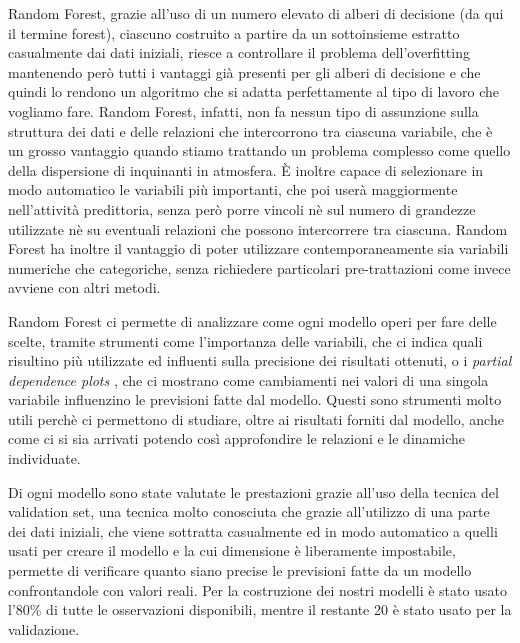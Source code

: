 \documentclass[a4paper]{report}
\begin{document}
Random Forest, grazie all'uso di un numero elevato di alberi di decisione (da qui il termine forest), ciascuno costruito a partire da un sottoinsieme estratto casualmente dai dati iniziali, riesce a controllare il problema dell'overfitting mantenendo però tutti i vantaggi già presenti per gli alberi di decisione e che quindi lo rendono un algoritmo che si adatta perfettamente al tipo di lavoro che vogliamo fare. Random Forest, infatti, non fa nessun tipo di assunzione sulla struttura dei dati e delle relazioni che intercorrono tra ciascuna variabile, che è un grosso vantaggio quando stiamo trattando un problema complesso come quello della dispersione di inquinanti in atmosfera. È inoltre capace di selezionare in modo automatico le variabili più importanti, che poi userà maggiormente nell'attività predittoria, senza però porre vincoli nè sul numero di grandezze utilizzate nè su eventuali relazioni che possono intercorrere tra ciascuna. Random Forest ha inoltre il vantaggio di poter utilizzare contemporaneamente sia variabili numeriche che categoriche, senza richiedere particolari pre-trattazioni come invece avviene con altri metodi. 

Random Forest ci permette di analizzare come ogni modello operi per fare delle scelte, tramite strumenti come l'importanza delle variabili, che ci indica quali risultino più utilizzate ed influenti sulla precisione dei risultati ottenuti, o i \textit{partial dependence plots}
, che ci mostrano come cambiamenti nei valori di una singola variabile influenzino le previsioni fatte dal modello. Questi sono strumenti molto utili perchè ci permettono di studiare, oltre ai risultati forniti dal modello, anche come ci si sia arrivati potendo così approfondire le relazioni e le dinamiche individuate.

Di ogni modello sono state valutate le prestazioni grazie all'uso della tecnica del validation set, una tecnica molto conosciuta che grazie all'utilizzo di una parte dei dati iniziali, che viene sottratta casualmente ed in modo automatico a quelli usati per creare il modello e la cui dimensione è liberamente impostabile, permette di verificare quanto siano precise le previsioni fatte da un modello confrontandole con valori reali. Per la costruzione dei nostri modelli è stato usato l'80\% di tutte le osservazioni disponibili, mentre il restante 20 è stato usato per la validazione.
\end{document}
